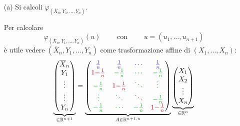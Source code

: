 \begin{enumerate}
\item [(a)] Si calcoli $\varphi_{\left(\overline{X}_n,Y_1,\dots,Y_n\right)}$.

Per calcolare 
$$
\varphi_{(\overline{X}_n,Y_1,\dots,Y_n)}(u) \qquad \text{ con } \qquad u=\left(u_1,\dots,u_{n+1}\right)
$$
è utile vedere $\left(\overline{X}_n,Y_1,\dots,Y_n\right)$ come trasformazione affine di $(X_1,\dots,X_n)$:
$$
\displaystyle \underbrace{\begin{pmatrix}
\overline{X}_{n}\\
Y_{1}\\
\vdots \\
\vdots \\
Y_{n}
\end{pmatrix}}_{\in \mathbb{R}^{n+1}} =\underbrace{\begin{pmatrix}
\textcolor[rgb]{0.15,0.11,0.85}{\frac{1}{n}} & \textcolor[rgb]{0.15,0.11,0.85}{\frac{1}{n}} & \textcolor[rgb]{0.15,0.11,0.85}{\cdots } & \textcolor[rgb]{0.15,0.11,0.85}{\frac{1}{n}}\\
\textcolor[rgb]{0.82,0.01,0.11}{1-}\textcolor[rgb]{0.82,0.01,0.11}{\frac{1}{n}} & \textcolor[rgb]{0.05,0.69,0.11}{-}\textcolor[rgb]{0.05,0.69,0.11}{\frac{1}{n}} & \textcolor[rgb]{0.05,0.69,0.11}{\cdots } & \textcolor[rgb]{0.05,0.69,0.11}{-}\textcolor[rgb]{0.05,0.69,0.11}{\frac{1}{n}}\\
\textcolor[rgb]{0.05,0.69,0.11}{-}\textcolor[rgb]{0.05,0.69,0.11}{\frac{1}{n}} & \textcolor[rgb]{0.82,0.01,0.11}{1-}\textcolor[rgb]{0.82,0.01,0.11}{\frac{1}{n}} & \textcolor[rgb]{0.05,0.69,0.11}{\ddots } & \textcolor[rgb]{0.05,0.69,0.11}{\vdots }\\
\textcolor[rgb]{0.05,0.69,0.11}{\vdots } & \textcolor[rgb]{0.05,0.69,0.11}{\ddots } & \textcolor[rgb]{0.82,0.01,0.11}{\ddots } & \textcolor[rgb]{0.05,0.69,0.11}{-}\textcolor[rgb]{0.05,0.69,0.11}{\frac{1}{n}}\\
\textcolor[rgb]{0.05,0.69,0.11}{-}\textcolor[rgb]{0.05,0.69,0.11}{\frac{1}{n}} & \textcolor[rgb]{0.05,0.69,0.11}{\cdots } & \textcolor[rgb]{0.05,0.69,0.11}{-}\textcolor[rgb]{0.05,0.69,0.11}{\frac{1}{n}} & \textcolor[rgb]{0.82,0.01,0.11}{1-}\textcolor[rgb]{0.82,0.01,0.11}{\frac{1}{n}}
\end{pmatrix}}_{A \in \mathbb{R}^{n+1,n}}\underbrace{\begin{pmatrix}
X_{1}\\
X_{2}\\
\vdots \\
X_{n}
\end{pmatrix}}_{\in \mathbb{R}^{n}}
$$
\end{enumerate}

